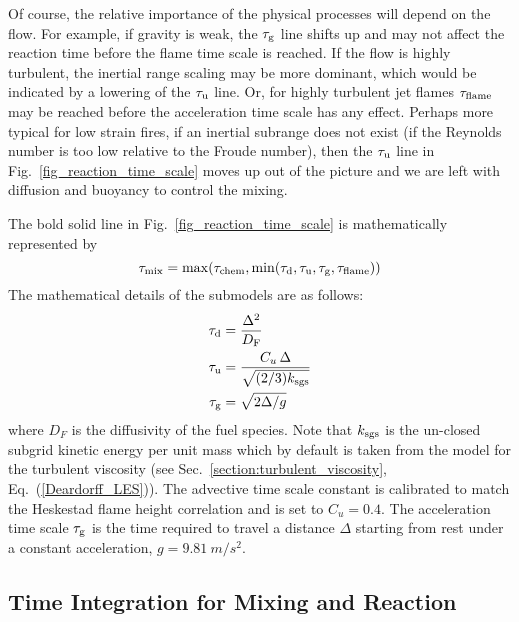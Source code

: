 Of course, the relative importance of the physical processes will depend on the flow.  For example, if gravity is weak, the $\tau_{\rm g}$ line shifts up and may not affect the reaction time before the flame time scale is reached.  If the flow is highly turbulent, the inertial range scaling may be more dominant, which would be indicated by a lowering of the $\tau_{\rm u}$ line.  Or, for highly turbulent jet flames $\tau_{\rm flame}$ may be reached before the acceleration time scale has any effect.  Perhaps more typical for low strain fires, if an inertial subrange does not exist (if the Reynolds number is too low relative to the Froude number), then the $\tau_{\rm u}$ line in Fig.~\ref{fig_reaction_time_scale} moves up out of the picture and we are left with diffusion and buoyancy to control the mixing.

The bold solid line in Fig.~\ref{fig_reaction_time_scale} is mathematically represented by
\begin{equation}
\label{eqn_tau_mix}
\tau_{\rm mix} = \max(\tau_{\rm chem},\min(\tau_{\rm d},\tau_{\rm u},\tau_{\rm g},\tau_{\rm flame}))
\end{equation}
The mathematical details of the submodels are as follows:
\begin{align}
\label{eq:tau_diff} \tau_{\rm d} &= \frac{\Delta^2}{D_{\si{F}}} \\
\label{eq:tau_sgs}  \tau_{\rm u} &= \frac{C_u \,\Delta}{\sqrt{(2/3)k_{\rm sgs}}} \\
\label{eqn_tau_grav}\tau_{\rm g} &= \sqrt{ 2\Delta/g }
\end{align}
where $D_{\si{F}}$ is the diffusivity of the fuel species. Note that $k_{\rm sgs}$ is the un-closed subgrid kinetic energy per unit mass which by default is taken from the model for the turbulent viscosity (see Sec.~\ref{section:turbulent_viscosity}, Eq.~(\ref{Deardorff_LES})).  The advective time scale constant is calibrated to match the Heskestad flame height correlation \cite{FDS_Validation_Guide} and is set to $C_u = 0.4$. The acceleration time scale $\tau_{\rm g}$ is the time required to travel a distance $\Delta$ starting from rest under a constant acceleration, $g=\SI{9.81}{m/s^2}$.



\subsection{Time Integration for Mixing and Reaction}
\label{sec:subgrid_evironment}

